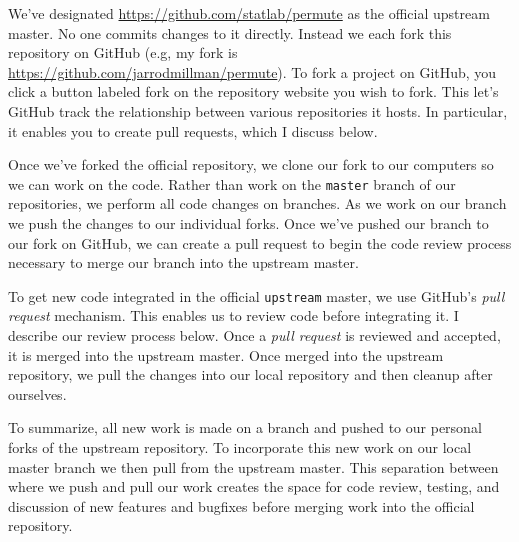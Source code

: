 
We've designated \url{https://github.com/statlab/permute} as the official
upstream master.  No one commits changes to it directly.  Instead we each fork
this repository on GitHub (e.g, my fork is
\url{https://github.com/jarrodmillman/permute}).  To fork a project on GitHub,
you click a button labeled fork on the repository website you wish to fork.
This let's GitHub track the relationship between various repositories it hosts.
In particular, it enables you to create pull requests, which I discuss below.

Once we've forked the official repository, we clone our fork to our computers
so we can work on the code.  Rather than work on the \texttt{master}
branch of our repositories, we perform all code changes on branches.  As
we work on our branch we push the changes to our individual forks.  Once
we've pushed our branch to our fork on GitHub, we can create a pull request
to begin the code review process necessary to merge our branch into the
upstream master.

To get new code integrated in the official \texttt{upstream} master, we use
GitHub's \emph{pull request} mechanism.  This enables us to review code
before integrating it.  I describe our review process below.
Once a \emph{pull request} is reviewed and accepted, it is merged into
the upstream master.  Once merged into the upstream repository, we pull
the changes into our local repository and then cleanup after ourselves.

To summarize, all new work is made on a branch and pushed to our
personal forks of the upstream repository. To incorporate this new
work on our local master branch we then pull from the upstream
master.  This separation between where we push and pull our
work creates the space for code review, testing, and discussion of
new features and bugfixes before merging work into the official 
repository.


